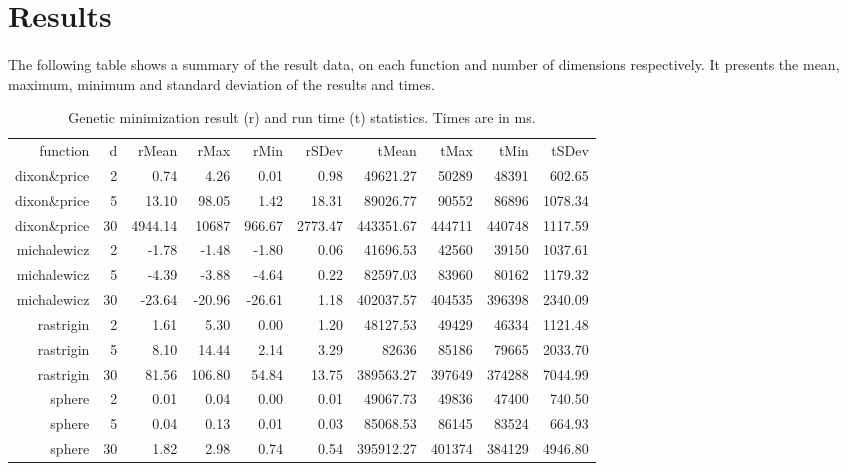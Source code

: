\documentclass{article}
\begin{document}
    \section{Results}
    \paragraph{}
    The following table shows a summary of the result data, on each function and number of dimensions respectively. It presents the mean, maximum, minimum and standard deviation of the results and times.
    \begin{table}[ht]
        \centering
        {\footnotesize
        \begin{tabular}{rr|rrrrrrrr}
        function & d & rMean & rMax & rMin & rSDev & tMean & tMax & tMin & tSDev \\ 
        dixon\&price & 2 & 0.74 & 4.26 & 0.01 & 0.98 & 49621.27 & 50289 & 48391 & 602.65 \\ 
           \hline
        dixon\&price & 5 & 13.10 & 98.05 & 1.42 & 18.31 & 89026.77 & 90552 & 86896 & 1078.34 \\ 
           \hline
        dixon\&price & 30 & 4944.14 & 10687 & 966.67 & 2773.47 & 443351.67 & 444711 & 440748 & 1117.59 \\ 
        \hline
        michalewicz & 2 & -1.78 & -1.48 & -1.80 & 0.06 & 41696.53 & 42560 & 39150 & 1037.61 \\ 
           \hline
        michalewicz & 5 & -4.39 & -3.88 & -4.64 & 0.22 & 82597.03 & 83960 & 80162 & 1179.32 \\ 
           \hline
        michalewicz & 30 & -23.64 & -20.96 & -26.61 & 1.18 & 402037.57 & 404535 & 396398 & 2340.09 \\ 
        \hline
        rastrigin & 2 & 1.61 & 5.30 & 0.00 & 1.20 & 48127.53 & 49429 & 46334 & 1121.48 \\ 
           \hline
        rastrigin & 5 & 8.10 & 14.44 & 2.14 & 3.29 & 82636 & 85186 & 79665 & 2033.70 \\ 
           \hline
        rastrigin & 30 & 81.56 & 106.80 & 54.84 & 13.75 & 389563.27 & 397649 & 374288 & 7044.99 \\ 
        \hline
        sphere & 2 & 0.01 & 0.04 & 0.00 & 0.01 & 49067.73 & 49836 & 47400 & 740.50 \\ 
           \hline
        sphere & 5 & 0.04 & 0.13 & 0.01 & 0.03 & 85068.53 & 86145 & 83524 & 664.93 \\ 
           \hline
        sphere & 30 & 1.82 & 2.98 & 0.74 & 0.54 & 395912.27 & 401374 & 384129 & 4946.80 \\ 
        \hline
        \end{tabular}
        }
        \caption{Genetic minimization result (r) and run time (t) statistics. Times are in ms.}
    \end{table}
\end{document}
